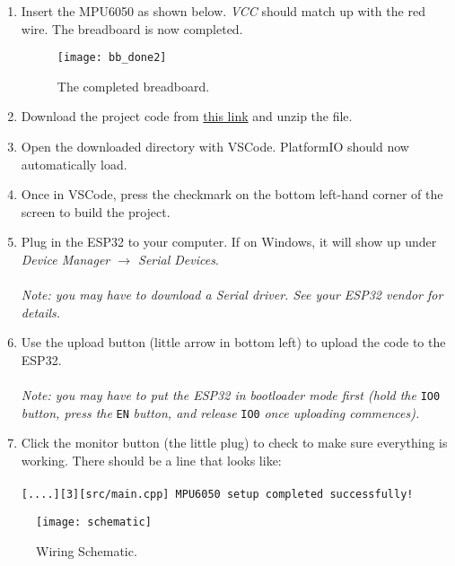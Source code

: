 \begin{enumerate}
\item Insert the MPU6050 as shown below. \textit{VCC} should match up with the
  red wire. The breadboard is now completed.
  \begin{figure}[H]
    \centering
    \texttt{[image: bb\_done2]}
    \caption{The completed breadboard.}
  \end{figure}
  
\item Download the project code
  from
  \href{https://github.com/MrAwesomeRocks/dtc-head-tracker/archive/refs/heads/master.zip}{this
    link} and unzip the file.
  
\item Open the downloaded directory with VSCode. PlatformIO should now
  automatically load.
  
\item Once in VSCode, press the checkmark on the bottom left-hand corner of the
  screen to build the project.
  
\item Plug in the ESP32 to your computer. If on Windows, it will show up
  under \textit{Device Manager $\rightarrow$ Serial Devices}.\\
  \\
  \textit{Note: you may have to download a Serial driver. See your ESP32 vendor
    for details.}
  
\item Use the upload button (little arrow in bottom left) to upload the code to
  the ESP32.\\
  \\
  \textit{Note: you may have to put the ESP32 in bootloader mode first (hold
    the} \verb|IO0| \textit{button, press the} \verb|EN| \textit{button, and
    release} \verb|IO0| \textit{once uploading commences).}

\item Click the monitor button (the little plug) to check to make sure
  everything is working. There should be a line that looks like:\\
  \\
  \color{ForestGreen}\verb|[....][3][src/main.cpp] MPU6050 setup completed successfully!|
\end{enumerate}

\begin{figure}[h]
  \centering
  \texttt{[image: schematic]}
  \caption{Wiring Schematic.}
  \label{fig:schematic}
\end{figure}


